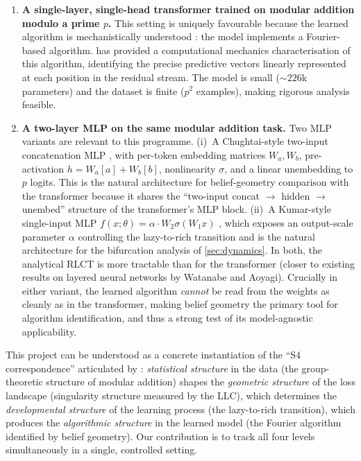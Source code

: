 \documentclass[11pt,a4paper]{article}
\begin{document}
\begin{enumerate}[label=(\roman*)]
    \item \textbf{A single-layer, single-head transformer trained on modular addition modulo a prime $p$.} This setting is uniquely favourable because the learned algorithm is mechanistically understood \citep{nanda2023progress, chughtai2023toy, yip2024modular, wu2024unified}: the model implements a Fourier-based algorithm. \citet{poncini2025compmech} has provided a computational mechanics characterisation of this algorithm, identifying the precise predictive vectors linearly represented at each position in the residual stream. The model is small (${\sim}226$k parameters) and the dataset is finite ($p^2$ examples), making rigorous analysis feasible.

    \item \textbf{A two-layer MLP on the same modular addition task.} Two MLP variants are relevant to this programme. (i)~A Chughtai-style two-input concatenation MLP \citep{chughtai2023toy}, with per-token embedding matrices $W_a, W_b$, pre-activation $h = W_a[a] + W_b[b]$, nonlinearity $\sigma$, and a linear unembedding to $p$ logits. This is the natural architecture for belief-geometry comparison with the transformer because it shares the ``two-input concat $\to$ hidden $\to$ unembed'' structure of the transformer's MLP block. (ii)~A Kumar-style single-input MLP $f(x; \theta) = \alpha \cdot W_2 \sigma(W_1 x)$ \citep{kumar2024grokking}, which exposes an output-scale parameter $\alpha$ controlling the lazy-to-rich transition and is the natural architecture for the bifurcation analysis of \cref{sec:dynamics}. In both, the analytical RLCT is more tractable than for the transformer (closer to existing results on layered neural networks by Watanabe and Aoyagi). Crucially in either variant, the learned algorithm \emph{cannot} be read from the weights as cleanly as in the transformer, making belief geometry the primary tool for algorithm identification, and thus a strong test of its model-agnostic applicability.
\end{enumerate}

This project can be understood as a concrete instantiation of the ``S4 correspondence'' articulated by \citet{pepinlehalleur2025youare}: \emph{statistical structure} in the data (the group-theoretic structure of modular addition) shapes the \emph{geometric structure} of the loss landscape (singularity structure measured by the LLC), which determines the \emph{developmental structure} of the learning process (the lazy-to-rich transition), which produces the \emph{algorithmic structure} in the learned model (the Fourier algorithm identified by belief geometry). Our contribution is to track all four levels simultaneously in a single, controlled setting.
\end{document}
